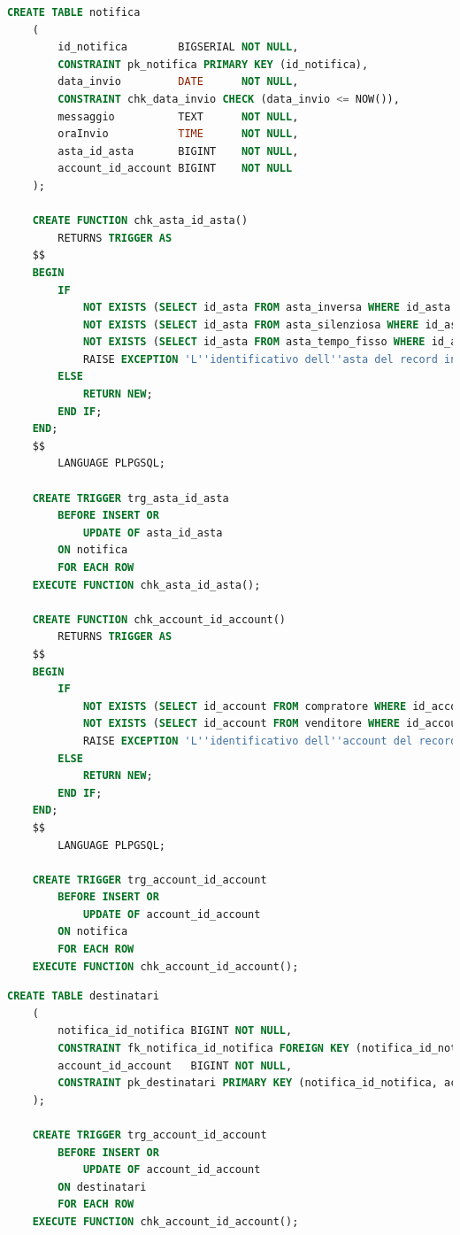 \begin{lstlisting}[language=SQL, caption=Relazione notifica]
    CREATE TABLE notifica
    (
        id_notifica        BIGSERIAL NOT NULL,
        CONSTRAINT pk_notifica PRIMARY KEY (id_notifica),
        data_invio         DATE      NOT NULL,
        CONSTRAINT chk_data_invio CHECK (data_invio <= NOW()),
        messaggio          TEXT      NOT NULL,
        oraInvio           TIME      NOT NULL,
        asta_id_asta       BIGINT    NOT NULL,
        account_id_account BIGINT    NOT NULL
    );
    
    CREATE FUNCTION chk_asta_id_asta()
        RETURNS TRIGGER AS
    $$
    BEGIN
        IF
            NOT EXISTS (SELECT id_asta FROM asta_inversa WHERE id_asta = NEW.asta_id_asta) AND
            NOT EXISTS (SELECT id_asta FROM asta_silenziosa WHERE id_asta = NEW.asta_id_asta) AND
            NOT EXISTS (SELECT id_asta FROM asta_tempo_fisso WHERE id_asta = NEW.asta_id_asta) THEN
            RAISE EXCEPTION 'L''identificativo dell''asta del record inserito non referenzia un''asta esistente';
        ELSE
            RETURN NEW;
        END IF;
    END;
    $$
        LANGUAGE PLPGSQL;
    
    CREATE TRIGGER trg_asta_id_asta
        BEFORE INSERT OR
            UPDATE OF asta_id_asta
        ON notifica
        FOR EACH ROW
    EXECUTE FUNCTION chk_asta_id_asta();
    
    CREATE FUNCTION chk_account_id_account()
        RETURNS TRIGGER AS
    $$
    BEGIN
        IF
            NOT EXISTS (SELECT id_account FROM compratore WHERE id_account = NEW.id_account) AND
            NOT EXISTS (SELECT id_account FROM venditore WHERE id_account = NEW.id_account) THEN
            RAISE EXCEPTION 'L''identificativo dell''account del record inserito non referenzia un account esistente';
        ELSE
            RETURN NEW;
        END IF;
    END;
    $$
        LANGUAGE PLPGSQL;
    
    CREATE TRIGGER trg_account_id_account
        BEFORE INSERT OR
            UPDATE OF account_id_account
        ON notifica
        FOR EACH ROW
    EXECUTE FUNCTION chk_account_id_account();
\end{lstlisting}

\begin{lstlisting}[language=SQL, caption=Relazione destinatari]
    CREATE TABLE destinatari
    (
        notifica_id_notifica BIGINT NOT NULL,
        CONSTRAINT fk_notifica_id_notifica FOREIGN KEY (notifica_id_notifica) REFERENCES notifica (id_notifica) ON UPDATE CASCADE ON DELETE CASCADE,
        account_id_account   BIGINT NOT NULL,
        CONSTRAINT pk_destinatari PRIMARY KEY (notifica_id_notifica, account_id_account)
    );
    
    CREATE TRIGGER trg_account_id_account
        BEFORE INSERT OR
            UPDATE OF account_id_account
        ON destinatari
        FOR EACH ROW
    EXECUTE FUNCTION chk_account_id_account();
\end{lstlisting}

